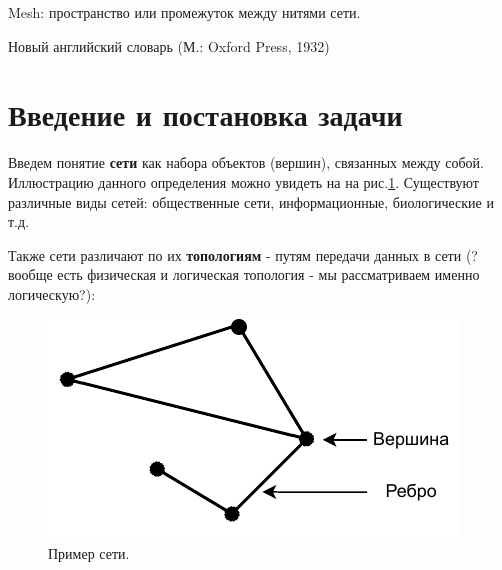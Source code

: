 \documentclass[a4paper]{article}
\begin{document}
\newcommand{\apple}{\char"F8FF}



	

\pagestyle{fancy} 
\fancyhead[C]{}
\fancyfoot[C]{ \noindent\rule{\textwidth}{0.4pt} \thepage }

\tableofcontents

\newpage

\epigraph{Mesh: пространство или промежуток между нитями сети.}{Новый английский словарь (М.: Oxford Press, 1932)}

\section{Введение и постановка задачи}
Введем понятие \textbf{сети} как набора объектов (вершин), связанных между собой. Иллюстрацию данного определения можно увидеть на на рис.\ref{p1}. Существуют различные виды сетей: общественные сети, информационные, биологические и т.д. \par
Также сети различают по их \textbf{топологиям} - путям передачи данных в сети (?вообще есть физическая и логическая топология - мы рассматриваем именно логическую?):

\begin{figure}[H]
	\begin{center}
	\includegraphics[width=0.4\linewidth]{net.pdf}
	\caption{Пример сети.} 
    \label{p1}
    \end {center}
\end{figure}
\end{document}
